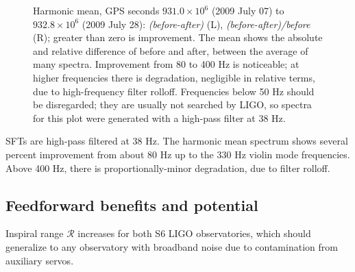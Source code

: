 \begin{figure}
\begin{center}
\caption{Harmonic mean, GPS seconds $931.0 \times 10^6$ (2009 July 07) to $932.8\times 10^6$ (2009 July 28): \textit{(before-after)} (L), \textit{(before-after)/before} (R); greater than zero is improvement. The mean shows the absolute and relative difference of before and after, between the average of many spectra. Improvement from 80 to 400 Hz is noticeable; at higher frequencies there is degradation, negligible in relative terms, due to high-frequency filter rolloff. Frequencies below 50 Hz should be disregarded; they are usually not searched by LIGO, so spectra for this plot were generated with a high-pass filter at 38 Hz.}
\label{SFTgraph}
\end{center}
\end{figure}

SFTs are high-pass filtered at 38 Hz. The harmonic mean spectrum shows several percent improvement from about 80 Hz up to the 330 Hz violin mode frequencies. Above 400 Hz, there is proportionally-minor degradation,  due to filter rolloff. 

        \subsection{Feedforward benefits and potential}
        \label{benefits}

Inspiral range $\mathcal{R}$ increases for both S6 LIGO observatories, which should generalize to any observatory with broadband noise due to contamination from auxiliary servos.

